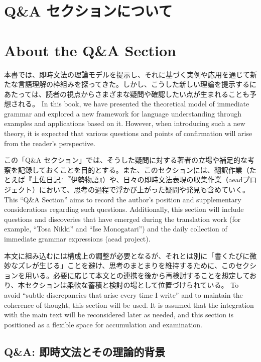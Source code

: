 \ifJPN
\section{Q\&A セクションについて}
\else
\section{About the Q\&A Section}
\fi
\label{sec:QandA}

\ifJPN
本書では、即時文法の理論モデルを提示し、それに基づく実例や応用を通じて新たな言語理解の枠組みを探ってきた。しかし、こうした新しい理論を提示するにあたっては、読者の視点からさまざまな疑問や確認したい点が生まれることも予想される。
\else
In this book, we have presented the theoretical model of immediate grammar and explored a new framework for language understanding through examples and applications based on it. However, when introducing such a new theory, it is expected that various questions and points of confirmation will arise from the reader's perspective.
\fi

\ifJPN
この「Q\&A セクション」では、そうした疑問に対する著者の立場や補足的な考察を記録しておくことを目的とする。また、このセクションには、翻訳作業（たとえば『土佐日記』『伊勢物語』）や、日々の即時文法表現の収集作業（aeadプロジェクト）において、思考の過程で浮かび上がった疑問や発見も含めていく。
\else
This ``Q\&A Section'' aims to record the author's position and supplementary considerations regarding such questions. Additionally, this section will include questions and discoveries that have emerged during the translation work (for example, ``Tosa Nikki'' and ``Ise Monogatari'') and the daily collection of immediate grammar expressions (aead project).
\fi

\ifJPN
本文に組み込むには構成上の調整が必要となるが、それとは別に「書くたびに微妙なズレが生じる」ことを避け、思考のまとまりを維持するために、このセクションを用いる。必要に応じて本文との連携を後から再検討することを想定しており、本セクションは柔軟な蓄積と検討の場として位置づけられている。
\else
To avoid ``subtle discrepancies that arise every time I write'' and to maintain the coherence of thought, this section will be used. It is assumed that the integration with the main text will be reconsidered later as needed, and this section is positioned as a flexible space for accumulation and examination.
\fi

\ifJPN
\subsection{Q\&A: 即時文法とその理論的背景}
\else
